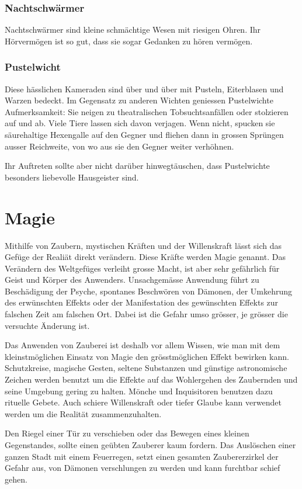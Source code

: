 \documentclass[10pt,twoside,twocolumn,openany]{book}
\begin{document}
\begin{multicols}{2}
	\subsection{Nachtschwärmer}
	Nachtschwärmer sind kleine schmächtige Wesen mit riesigen Ohren. Ihr Hörvermögen ist so gut, dass sie sogar Gedanken zu hören vermögen.
	
	\subsection{Pustelwicht}
	Diese hässlichen Kameraden sind über und über mit Pusteln, Eiterblasen und Warzen bedeckt. Im Gegensatz zu anderen Wichten geniessen Pustelwichte Aufmerksamkeit: Sie neigen zu theatralischen Tobsuchtsanfällen oder stolzieren auf und ab. Viele Tiere lassen sich davon verjagen. Wenn nicht, spucken sie säurehaltige Hexengalle auf den Gegner und fliehen dann in grossen Sprüngen ausser Reichweite, von wo aus sie den Gegner weiter verhöhnen.
	
	Ihr Auftreten sollte aber nicht darüber hinwegtäuschen, dass Pustelwichte besonders liebevolle Hausgeister sind.
\end{multicols}

\chapter{Magie}
\begin{multicols}{2}
Mithilfe von Zaubern, mystischen Kräften und der Willenskraft lässt sich das Gefüge der Realiät direkt verändern. Diese Kräfte werden Magie genannt. Das Verändern des Weltgefüges verleiht grosse Macht, ist aber sehr gefährlich für Geist und Körper des Anwenders. Unsachgemässe Anwendung führt zu Beschädigung der Psyche, spontanes Beschwören von Dämonen, der Umkehrung des erwünschten Effekts oder der Manifestation des gewünschten Effekts zur falschen Zeit am falschen Ort. Dabei ist die Gefahr umso grösser, je grösser die versuchte Änderung ist.

Das Anwenden von Zauberei ist deshalb vor allem Wissen, wie man mit dem kleinstmöglichen Einsatz von Magie den grösstmöglichen Effekt bewirken kann. Schutzkreise, magische Gesten, seltene Substanzen und günstige astronomische Zeichen werden benutzt um die Effekte auf das Wohlergehen des Zaubernden und seine Umgebung gering zu halten. Mönche und Inquisitoren benutzen dazu rituelle Gebete. Auch schiere Willenskraft oder tiefer Glaube kann verwendet werden um die Realität zusammenzuhalten.

Den Riegel einer Tür zu verschieben oder das Bewegen eines kleinen Gegenstandes, sollte einen geübten Zauberer kaum fordern. Das Auslöschen einer ganzen Stadt mit einem Feuerregen, setzt einen gesamten Zaubererzirkel der Gefahr aus, von Dämonen verschlungen zu werden und kann furchtbar schief gehen.
\end{multicols}
\end{document}
